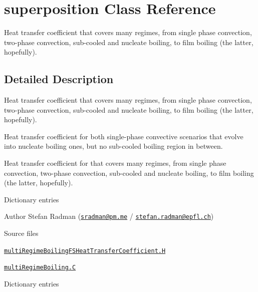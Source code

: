 \hypertarget{classFoam_1_1FSHeatTransferCoefficientModels_1_1superposition}{}\section{superposition Class Reference}
\label{classFoam_1_1FSHeatTransferCoefficientModels_1_1superposition}


Heat transfer coefficient that covers many regimes, from single phase convection, two-\/phase convection, sub-\/cooled and nucleate boiling, to film boiling (the latter, hopefully).  




\subsection{Detailed Description}
Heat transfer coefficient that covers many regimes, from single phase convection, two-\/phase convection, sub-\/cooled and nucleate boiling, to film boiling (the latter, hopefully). 

Heat transfer coefficient for both single-\/phase convective scenarios that evolve into nucleate boiling ones, but no sub-\/cooled boiling region in between.

Heat transfer coefficient for that covers many regimes, from single phase convection, two-\/phase convection, sub-\/cooled and nucleate boiling, to film boiling (the latter, hopefully).

\label{_Description}%
 Dictionary entries

Author Stefan Radman (\href{mailto:sradman@pm.me}{\tt sradman@pm.\+me} / \href{mailto:stefan.radman@epfl.ch}{\tt stefan.\+radman@epfl.\+ch})

\begin{DoxyParagraph}{Source files}

\begin{DoxyItemize}
\item \href{../../../home/carlo/data/GeN-Foam/GeN-Foam_ffn/GeN-Foam/GeN-Foam/classes/thermalHydraulics/src/physicsModels/heatTransferModels/FSHeatTransferCoefficientModels/multiRegimeBoiling/multiRegimeBoilingFSHeatTransferCoefficient.H}{\tt multi\+Regime\+Boiling\+F\+S\+Heat\+Transfer\+Coefficient.\+H} 
\item \href{../../../home/carlo/data/GeN-Foam/GeN-Foam_ffn/GeN-Foam/GeN-Foam/classes/thermalHydraulics/src/physicsModels/heatTransferModels/FSHeatTransferCoefficientModels/multiRegimeBoiling/multiRegimeBoiling.C}{\tt multi\+Regime\+Boiling.\+C} 
\end{DoxyItemize}
\end{DoxyParagraph}
\label{_Description}%
 Dictionary entries

